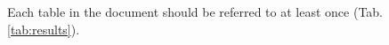 \documentclass[a4paper,twoside,12pt]{book}
\begin{document}
%
%
%
%
%        


Each table in the document should be referred to at least once (Tab. \ref{tab:results}).
\end{document}
